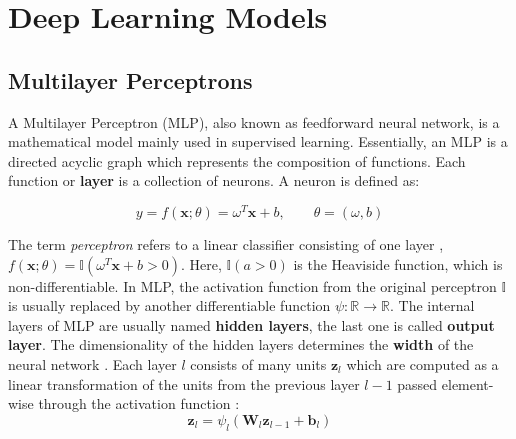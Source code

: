 \section{Deep Learning Models}


\subsection{Multilayer Perceptrons}
\label{sec:Multilayer_Perceptron}
A Multilayer Perceptron (MLP), also known as feedforward neural network, is a mathematical model mainly used in supervised learning. Essentially, an MLP is a directed acyclic graph which represents the composition of functions. Each function or \textbf{layer} is a collection of neurons. A neuron is defined as:

\begin{equation}
    \label{eqn:neuron}
    y = f(\mathbf{x}; \theta) = \omega^T \mathbf{x} + b, \qquad \theta = (\omega, b)
\end{equation}

The term \textit{perceptron} refers to a linear classifier consisting of one layer \cite{rosenblatt1958}, $f(\mathbf{x}; \theta) = \mathbb{I}(\omega^T \mathbf{x} + b > 0)$.
Here, $\mathbb{I}(a>0)$ is the Heaviside function, which is non-differentiable. In MLP, the activation function from the original perceptron $\mathbb{I}$ is usually replaced by another differentiable function $\psi \colon \mathbb{R} \to \mathbb{R}$. The internal layers of MLP are usually named \textbf{hidden layers}, the last one is called \textbf{output layer}. The dimensionality of the hidden layers determines the \textbf{width} of the neural network \cite{goodfellow2016}. Each layer $l$ consists of many units $\mathbf{z}_l$ which are computed as a linear transformation of the units from the previous layer $l-1$ passed element-wise through the activation function \cite{murphy2022}:
\begin{equation*}
    \mathbf{z}_l = \psi_l (\mathbf{W}_l \mathbf{z}_{l-1} + \mathbf{b}_l)
\end{equation*}

